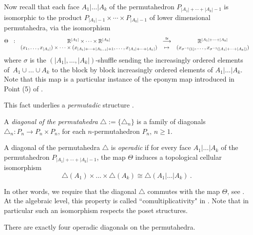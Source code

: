 Now recall that each face $A_1 | \ldots | A_k$ of the permutahedron $P_{|A_1|+\cdots + |A_k|-1}$ is isomorphic to the product $P_{|A_1|-1} \times \cdots \times P_{|A_k|-1}$ of lower dimensional permutahedra, via the isomorphism
\begin{equation*}
    \begin{matrix}
        \Theta & : & \mathbb R^{|A_1|} \times \cdots \times \mathbb R^{|A_k|} & \overset{\cong}{\longrightarrow} & \mathbb R^{|A_1|+\cdots+|A_k|} \\
         & & (x_1,\ldots,x_{|A_1|}) \times \cdots \times (x_{|A_1|+\cdots +|A_{k-1}|+1}, \ldots, x_{|A_1|+\cdots +|A_k|})  & \mapsto & (x_{\sigma^{-1}(1)},\ldots,x_{\sigma^{-1}(|A_1|+\cdots +|A_k|)})
    \end{matrix}
\end{equation*}
where $\sigma$ is the $(|A_1|,\ldots,|A_k|)$-shuffle sending the increasingly ordered elements of~$A_1 \cup \ldots \cup A_k$ to the block by block increasingly ordered elements of $A_1 | \ldots | A_k$.
Note that this map is a particular instance of the eponym map introduced in Point (5) of \cite[Prop. 2.3]{LA21}.

\begin{remark}
    This fact underlies a \emph{permutadic} structure \cite{LodayRonco11,MARKL2020105277}.
\end{remark}

A \emph{diagonal of the permutahedra} $\triangle:=\{\triangle_n\}$ is a family of diagonals $\triangle_n : P_n \to P_n \times P_n$, for each $n$-permutahedron $P_n$, $ n \geq 1$. 

\begin{definition}
    A diagonal of the permutahedra $\triangle$ is \emph{operadic} if for every face $A_1 | \ldots | A_k$ of the permutahedron $P_{|A_1|+\cdots + |A_k|-1}$, the map $\Theta$ induces a topological cellular isomorphism \[  \triangle(A_1) \times \ldots \times \triangle(A_k) \cong \triangle(A_1 | \ldots | A_k) \ . \]
\end{definition}
In other words, we require that the diagonal $\triangle$ commutes with the map $\Theta$, see \cite[Section 4.2]{LA21}.
At the algebraic level, this property is called ``comultiplicativity" in \cite{SaneblidzeUmble04}.
Note that in particular such an isomorphism respects the poset structures. 

\begin{theorem}
\label{prop:unique-operad}
There are exactly four operadic diagonals on the permutahedra. 
\end{theorem}

